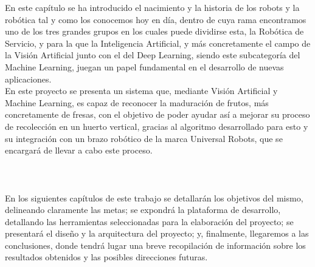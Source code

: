
\vspace{10mm}

En este capítulo se ha introducido el nacimiento y la historia de los robots y la robótica tal y como los conocemos hoy en día, dentro de cuya rama encontramos uno de los tres grandes grupos en los cuales puede dividirse esta, la Robótica de Servicio, y para la que la Inteligencia Artificial, y más concretamente el campo de la Visión Artificial junto con el del Deep Learning, siendo este subcategoría del Machine Learning, juegan un papel fundamental en el desarrollo de nuevas aplicaciones.\\

En este proyecto se presenta un sistema que, mediante Visión Artificial y Machine Learning, es capaz de reconocer la maduración de frutos, más concretamente de fresas, con el objetivo de poder ayudar así a mejorar su proceso de recolección en un huerto vertical, gracias al algoritmo desarrollado para esto y su integración con un brazo robótico de la marca Universal Robots, que se encargará de llevar a cabo este proceso.\\
\\
\\
\\
En los siguientes capítulos de este trabajo se detallarán los objetivos del mismo, delineando claramente las metas; se expondrá la plataforma de desarrollo, detallando las herramientas seleccionadas para la elaboración del proyecto; se presentará el diseño y la arquitectura del proyecto; y, finalmente, llegaremos a las conclusiones, donde tendrá lugar una breve recopilación de información sobre los resultados obtenidos y las posibles direcciones futuras. 
